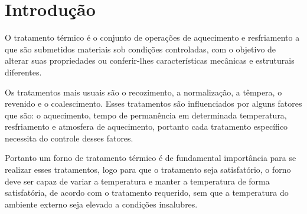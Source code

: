 \chapter*[Introdução]{Introdução}

O tratamento térmico é o conjunto de operações de aquecimento e resfriamento a que são submetidos materiais sob condições controladas, com o objetivo de alterar suas propriedades ou conferir-lhes características mecânicas e estruturais diferentes.

Os tratamentos mais usuais são o recozimento, a normalização, a têmpera, o revenido e o coalescimento. Esses tratamentos são influenciados por alguns fatores que são: o aquecimento, tempo de permanência em determinada temperatura, resfriamento e atmosfera de aquecimento, portanto cada tratamento específico necessita do controle desses fatores.

Portanto um forno de tratamento térmico é de fundamental importância para se realizar esses tratamentos, logo para que o tratamento seja satisfatório, o forno deve ser capaz de variar a temperatura e manter a temperatura de forma satisfatória, de acordo com o tratamento requerido, sem que a temperatura do ambiente externo seja elevado a condições insalubres.


